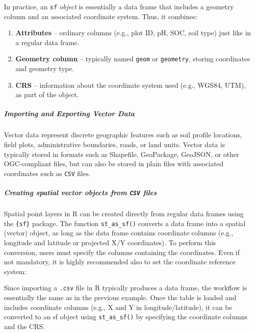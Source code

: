 \documentclass[
  10pt,
  b5paper,
  oneside]{book}
\providecommand{\tightlist}{%
  \setlength{\itemsep}{0pt}\setlength{\parskip}{0pt}}
\begin{document}
In practice, an \emph{\texttt{sf} object} is essentially a data frame that includes a geometry column and an associated coordinate system. Thus, it combines:\\

\begin{enumerate}
\def\labelenumi{\arabic{enumi}.}
\tightlist
\item
  \textbf{Attributes} -- ordinary columns (e.g., plot ID, pH, SOC, soil type) just like in a regular data frame.\\
\item
  \textbf{Geometry column} -- typically named \texttt{geom} or \texttt{geometry}, storing coordinates and geometry type.\\
\item
  \textbf{CRS} -- information about the coordinate system used (e.g., WGS84, UTM), as part of the object.\\
\end{enumerate}

\subparagraph*{Importing and Exporting Vector Data}\label{importing-and-exporting-vector-data}

Vector data represent discrete geographic features such as soil profile locations, field plots, administrative boundaries, roads, or land units.
Vector data is typically stored in formats such as Shapefile, GeoPackage, GeoJSON, or other OGC-compliant files, but can also be stored in plain files with associated coordinates such as \texttt{CSV} files.

\subparagraph*{\texorpdfstring{Creating spatial vector objects from \texttt{CSV} files}{Creating spatial vector objects from CSV files}}\label{creating-spatial-vector-objects-from-csv-files}

Spatial point layers in R can be created directly from regular data frames using the \texttt{\{sf\}} package.
The function \texttt{st\_as\_sf()} converts a data frame into a spatial (vector) object, as long as the data frame contains coordinate columns (e.g., longitude and latitude or projected X/Y coordinates).
To perform this conversion, users must specify the columns containing the coordinates. Even if not mandatory, it is highly recommended also to set the coordinate reference system:

Since importing a \texttt{.csv} file in R typically produces a data frame, the workflow is essentially the same as in the previous example. Once the table is loaded and includes coordinate columns (e.g., X and Y in longitude/latitude), it can be converted to an sf object using \texttt{st\_as\_sf()} by specifying the coordinate columns and the CRS.
\end{document}
